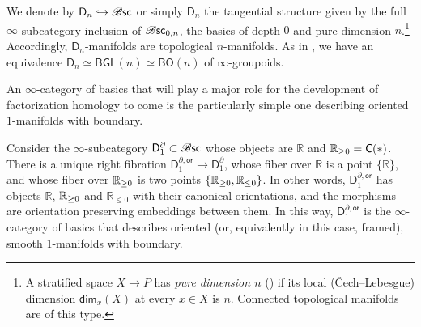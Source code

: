 \documentclass[../text]{subfiles}
\begin{document}
\begin{example}
    We denote by $\mathsf{D}_n\hookrightarrow \mathscr{B} \mathsf{sc}$ or simply $\mathsf{D}_n$ the tangential structure given by the full $\infty$-subcategory inclusion of $\mathscr{B} \mathsf{sc}_{0,n}$, the basics of depth $0$ and pure dimension $n$.\footnote{A stratified space $X\to P$ has \emph{pure dimension $n$} (\cite[Definition 2.4.1]{aft_localstrut}) if its local (\v{C}ech--Lebesgue) dimension $\mathsf{dim}_x(X)$ at every $x\in X$ is $n$. Connected topological manifolds are of this type.} Accordingly, $\mathsf{D}_n$-manifolds are topological $n$-manifolds. As in , we have an equivalence $\mathsf{D}_n\simeq \mathsf{BGL}(n)\simeq \mathsf{BO}(n)$ of $\infty$-groupoids.
\end{example}

An $\infty$-category of basics that will play a major role for the development of factorization homology to come is the particularly simple one describing oriented $1$-manifolds with boundary.

\begin{construction}\label{con:d_1^bor_structure}
    Consider the $\infty$-subcategory $\mathsf{D}_1^{\partial} \subset \mathscr{B} \mathsf{sc}$ whose objects are $\mathbb{R}$ and $\hoint = \cone(\ast)$. There is a unique right fibration $\mathsf{D}_1^{\partial, \mathsf{or}} \rightarrow \mathsf{D}_1^{\partial}$, whose fiber over $\mathbb{R}$ is a point $\{ \mathbb{R}\}$, and whose fiber over $\mathbb{R}_{\geq 0}$ is two points $\{ \mathbb{R}_{\geq 0}, {\mathbb{R}_{\leq 0}} \}$. In other words, $\mathsf{D}_1^{\partial, \mathsf{or}}$ has objects $\mathbb{R}$, $\mathbb{R}_{\geq 0}$ and $\mathbb{R}_{\leq 0}$ with their canonical orientations, and the morphisms are orientation preserving embeddings between them. In this way, $\mathsf{D}_1^{\partial, \mathsf{or}}$ is the $\infty$-category of basics that describes oriented (or, equivalently in this case, framed), smooth 1-manifolds with boundary.
\end{construction}
\end{document}
